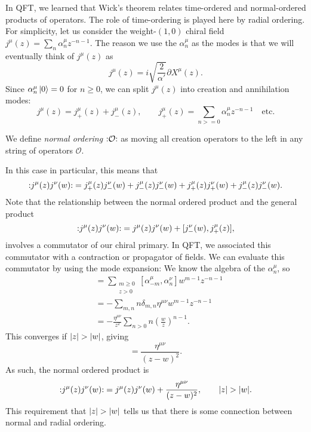 In QFT, we learned that Wick's theorem relates time-ordered and normal-ordered products of operators.
The role of time-ordering is played here by radial ordering.
For simplicity, let us consider the weight-$(1, 0)$ chiral field $j^{\mu}(z) = \sum_{n} \alpha^{\mu}_n z^{-n -1}$.
The reason we use the $\alpha^{\mu}_n$ as the modes is that we will eventually think of $j^{\mu}(z)$ as 
\begin{equation}
  j^{\mu} (z) = i \sqrt{\frac{2}{\alpha'}} \partial X^{\mu}(z).
\end{equation}
Since $\alpha_n^{\mu} \ket{ 0} = 0$ for $n \geq 0$, we can split $j^{\mu}(z)$ into creation and annihilation modes:
\begin{equation}
  j^{\mu}(z) = j^{\mu}_+ (z) + j^{\mu}_-(z), \qquad j_+^\mu (z) = \sum_{n>= 0} \alpha^{\mu}_n z^{-n-1} \quad \text{etc.}
\end{equation}
\begin{definition}
  We define \emph{normal ordering} $\mathop{:}\nolimits\!\mathcal{O}\!\mathop{:}\nolimits$ as moving all creation operators to the left in any string of operators $\mathcal{O}$.
\end{definition}
In this case in particular, this means that
\begin{equation}
  \mathop{:}\nolimits\!j^{\mu}(z) j^{\nu}(w)\!\mathop{:}\nolimits = j^{\mu}_+(z) j^{\nu}_-(w) + j^{\mu}_-(z) j^\nu_-(w) + j^{\mu}_+(z) j^{\nu}_+(w) + j^{\mu}_-(z) j^{\nu}_-(w).
\end{equation}
Note that the relationship between the normal ordered product and the general product
\begin{equation}
  \mathop{:}\nolimits\!j^{\mu}(z) j^{\nu}(w)\!\mathop{:}\nolimits = j^{\mu}(z) j^{\nu}(w) + [j^{\nu}_-(w), j^{\mu}_+(z)],
\end{equation}
involves a commutator of our chiral primary. In QFT, we associated this commutator with a contraction or propagator of fields.
We can evaluate this commutator by using the mode expansion: We know the algebra of the $\alpha^{\mu}_n$, so
\begin{align}
  [j^{\mu}_-(w), j_+^{\nu}(z)] &= \sum_{\substack{m \geq 0 \\ z > 0}} [\alpha^{\mu}_{-m}, \alpha^{\nu}_{n}] w^{m-1} z^{-n-1} \\
  &= -\sum_{m, n} n \delta_{m, n} \eta^{\mu\nu} w^{m-1} z^{-n-1} \\
  &= -\frac{\eta^{\mu\nu}}{z^2} \sum_{n> 0} n \left( \frac{w}{z} \right)^{n-1}.
\end{align}
This converges if $\abs{z} > \abs{w}$, giving
\begin{equation}
  [j^{\mu}_-(w), j^{\nu}_+(z)] = \frac{\eta^{\mu\nu}}{(z - w)^2}.
\end{equation}
As such, the normal ordered product is
\begin{equation}
  \mathop{:}\nolimits\!j^{\mu}(z) j^{\nu}(w)\!\mathop{:}\nolimits = j^{\mu}(z) j^{\nu}(w) + \frac{\eta^{\mu\nu}}{(z - w)^2}, \qquad \abs{z} > \abs{w}.
\end{equation}
This requirement that $\abs{z} > \abs{w}$ tells us that there is some connection between normal and radial ordering.
